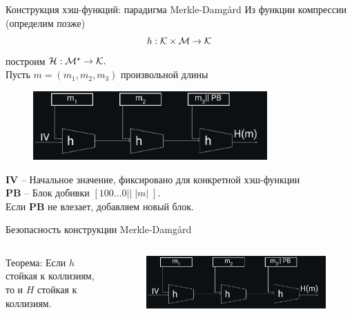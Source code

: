 \documentclass[usenames,dvipsnames,8pt,aspectratio=169]{beamer}
\begin{document}
\begin{frame}{Конструкция хэш-функций: парадигма Merkle-Damg\aa rd}
\Large
Из функции компрессии (определим позже) \[h: \mathcal{K} \times \mathcal{M} \rightarrow \mathcal{K}\]
построим $\mathcal{H}: \mathcal{M}^\star \rightarrow \mathcal{K}.$ \\[10pt]

Пусть $m = (m_1, m_2, m_3 )$ произвольной длины
\begin{figure}
	\includegraphics[width=0.8\textwidth]{MerkleDamgard}
\end{figure}

\textbf{IV} -- Начальное значение, фиксировано для конкретной хэш-функции \\
\textbf{PB} -- Блок добивки $\left[100\ldots0 || \; |m|  \; \right]$. \\
Если \textbf{PB}  не влезает, добавляем новый блок.

\end{frame}

\begin{frame}{Безопасность конструкции Merkle-Damg\aa rd}
\Large

\begin{columns}[T]
\begin{column}{0.5\textwidth}
	{\color{Orange} Теорема:} Если $h$ стойкая к коллизиям, то и  $H$ стойкая к коллизиям.
\end{column}
\begin{column}{0.5\textwidth}
	\begin{figure}
		\includegraphics[width=\textwidth]{MerkleDamgard}
	\end{figure}
\end{column}
\end{columns}




\end{frame}
\end{document}
